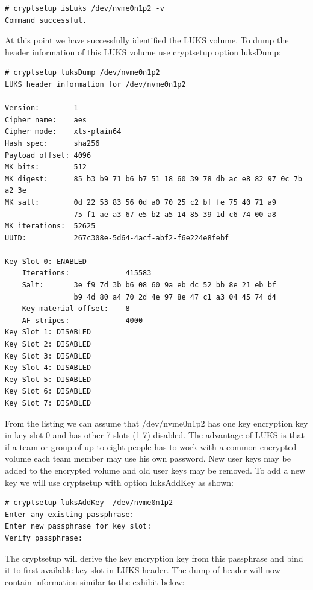 \begin{lstlisting}[columns=fixed,basicstyle=\ttfamily\footnotesize,tabsize=4,backgroundcolor=\color{yellow!10}]
# cryptsetup isLuks /dev/nvme0n1p2 -v
Command successful.
\end{lstlisting}
At this point we have successfully identified the LUKS volume.
To dump the header information of this LUKS volume use cryptsetup option luksDump:
\begin{lstlisting}[columns=fixed,basicstyle=\ttfamily\footnotesize,tabsize=4,backgroundcolor=\color{yellow!10}]
# cryptsetup luksDump /dev/nvme0n1p2
LUKS header information for /dev/nvme0n1p2

Version:		1
Cipher name:	aes
Cipher mode:	xts-plain64
Hash spec:		sha256
Payload offset:	4096
MK bits:		512
MK digest:		85 b3 b9 71 b6 b7 51 18 60 39 78 db ac e8 82 97 0c 7b a2 3e
MK salt:		0d 22 53 83 56 0d a0 70 25 c2 bf fe 75 40 71 a9
				75 f1 ae a3 67 e5 b2 a5 14 85 39 1d c6 74 00 a8
MK iterations: 	52625
UUID:          	267c308e-5d64-4acf-abf2-f6e224e8febf

Key Slot 0: ENABLED
	Iterations:				415583
	Salt:		3e f9 7d 3b b6 08 60 9a eb dc 52 bb 8e 21 eb bf
				b9 4d 80 a4 70 2d 4e 97 8e 47 c1 a3 04 45 74 d4
	Key material offset:	8
	AF stripes:				4000
Key Slot 1: DISABLED
Key Slot 2: DISABLED
Key Slot 3: DISABLED
Key Slot 4: DISABLED
Key Slot 5: DISABLED
Key Slot 6: DISABLED
Key Slot 7: DISABLED
\end{lstlisting}
From the listing we can assume that /dev/nvme0n1p2 has one key encryption key in key slot 0 and has other 7 slots (1-7) disabled.
The advantage of LUKS is that if a team or group of up to eight people has to work with a common encrypted volume each team member may use his own password.
New user keys may be added to the encrypted volume and old user keys may be removed.
To add a new key we will use cryptsetup with option luksAddKey as shown:
\begin{lstlisting}[columns=fixed,basicstyle=\ttfamily\footnotesize,tabsize=4,backgroundcolor=\color{yellow!10}]
# cryptsetup luksAddKey  /dev/nvme0n1p2
Enter any existing passphrase:
Enter new passphrase for key slot:
Verify passphrase:
\end{lstlisting}
The cryptsetup will derive the key encryption key from this passphrase and bind it to first available key slot in LUKS header.
The dump of header will now contain information similar to the exhibit below:
